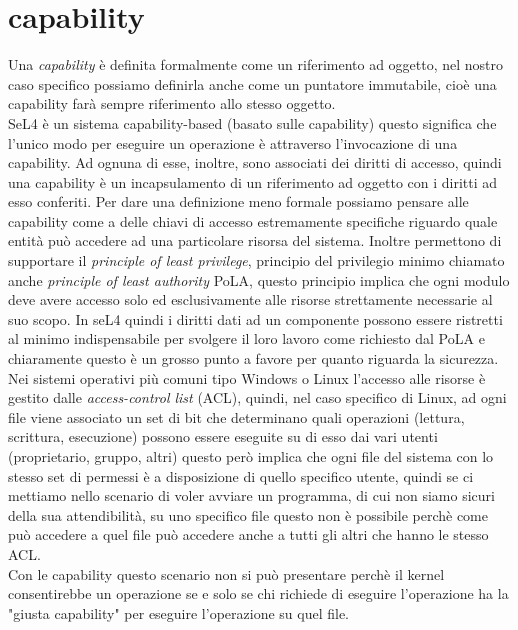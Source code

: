 \section{capability}
Una \textit{capability} è definita formalmente come un riferimento ad oggetto, nel nostro caso specifico possiamo definirla anche come un puntatore immutabile, cioè una capability farà sempre riferimento allo stesso oggetto.\\
SeL4 è un sistema capability-based (basato sulle capability) 
questo significa che l'unico modo per eseguire un operazione è attraverso l'invocazione di una capability. Ad ognuna di esse, inoltre, sono associati dei diritti di accesso, quindi una capability è un incapsulamento di un riferimento ad oggetto con i diritti ad esso conferiti.
Per dare una definizione meno formale possiamo pensare alle capability come a delle chiavi di accesso estremamente specifiche riguardo quale entità può accedere ad una particolare risorsa del sistema. Inoltre permettono di supportare il \textit{principle of least privilege}, principio del privilegio minimo chiamato anche \textit{principle of least authority} PoLA, questo principio implica che ogni modulo deve avere accesso solo ed esclusivamente alle risorse strettamente necessarie al suo scopo.
In seL4 quindi i diritti dati ad un componente possono essere ristretti al minimo indispensabile per svolgere il loro lavoro come richiesto dal PoLA e chiaramente questo è un grosso punto a favore per quanto riguarda la sicurezza.\\
Nei sistemi operativi più comuni tipo Windows o Linux l'accesso alle risorse è gestito dalle \textit{access-control list} (ACL), quindi, nel caso specifico di Linux, ad ogni file viene associato un set di bit che determinano quali operazioni (lettura, scrittura, esecuzione) possono essere eseguite su di esso dai vari utenti (proprietario, gruppo, altri) questo però implica che ogni file del sistema con lo stesso set di permessi è a disposizione di quello specifico utente, quindi se ci mettiamo nello scenario di voler avviare un programma, di cui non siamo sicuri della sua attendibilità, su uno specifico file questo non è possibile perchè come può accedere a quel file può accedere anche a tutti gli altri che hanno le stesso ACL.\\
Con le capability questo scenario non si può presentare perchè il kernel consentirebbe un operazione se e solo se chi richiede di eseguire l'operazione ha la "giusta capability" per eseguire l'operazione su quel file. 

